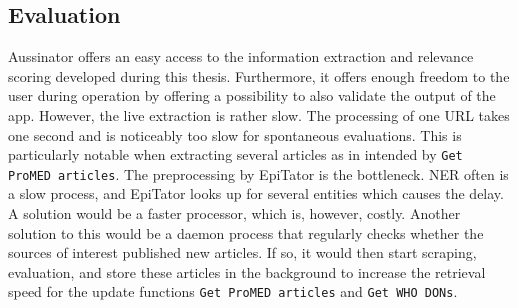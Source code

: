 \subsection{Evaluation}
  Aussinator offers an easy access to the information extraction and relevance scoring developed during this thesis. Furthermore, it offers enough freedom to the user during operation by offering a possibility to also validate the output of the app.
  However, the live extraction is rather slow. The processing of one URL takes one second and is noticeably too slow for spontaneous evaluations. This is particularly notable when extracting several articles as in intended by \texttt{Get ProMED articles}.
  The preprocessing by EpiTator is the bottleneck.
  NER often is a slow process, and EpiTator looks up for several entities which causes the delay.
  A solution would be a faster processor, which is, however, costly.
  Another solution to this would be a daemon process that regularly checks whether the sources of interest published new articles.
  If so, it would then start scraping, evaluation, and store these articles in the background to increase the retrieval speed for the update functions \texttt{Get ProMED articles} and \texttt{Get WHO DONs}.
